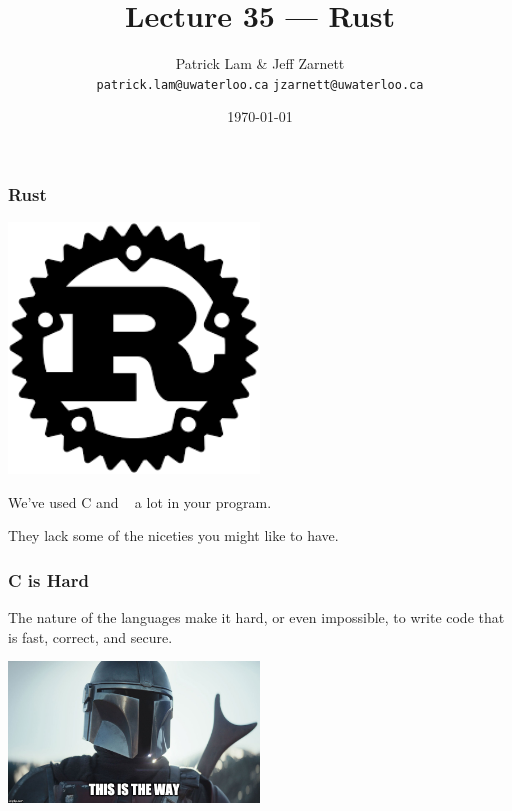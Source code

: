 

\title{Lecture 35 --- Rust }

\author{Patrick Lam \& Jeff Zarnett \\ \small \texttt{patrick.lam@uwaterloo.ca} \texttt{jzarnett@uwaterloo.ca}}
\date{\today}




\begin{frame}
  \titlepage

 \end{frame}




\begin{frame}
\frametitle{Rust}

\begin{center}
	\includegraphics[width=0.5\textwidth]{images/Rust.png}
\end{center}

We've used C and \CPP~ a lot in your program.

They lack some of the niceties you might like to have.

\end{frame}


\begin{frame}
\frametitle{C is Hard}

The nature of the languages make it hard, or even impossible, to write code that is fast, correct, and secure. 

\begin{center}
	\includegraphics[width=0.5\textwidth]{images/mando.jpg}
\end{center}

\end {frame}

